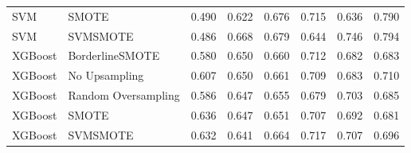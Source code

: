 \begin{tabular}{llllllll}
                            SVM &                         SMOTE & 0.490 &                     0.622 &                 0.676 &                  0.715 &                                   0.636 &    0.790 \\
                            SVM &                      SVMSMOTE & 0.486 &                     0.668 &                 0.679 &                  0.644 &                                   0.746 &    0.794 \\
                        XGBoost &               BorderlineSMOTE & 0.580 &                     0.650 &                 0.660 &                  0.712 &                                   0.682 &    0.683 \\
                        XGBoost &                 No Upsampling & 0.607 &                     0.650 &                 0.661 &                  0.709 &                                   0.683 &    0.710 \\
                        XGBoost &           Random Oversampling & 0.586 &                     0.647 &                 0.655 &                  0.679 &                                   0.703 &    0.685 \\
                        XGBoost &                         SMOTE & 0.636 &                     0.647 &                 0.651 &                  0.707 &                                   0.692 &    0.681 \\
                        XGBoost &                      SVMSMOTE & 0.632 &                     0.641 &                 0.664 &                  0.717 &                                   0.707 &    0.696 \\
\bottomrule
\end{tabular}

